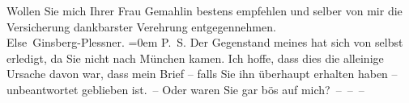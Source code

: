 \pstart
           Wollen Sie mich Ihrer Frau Gemahlin bestens empfehlen und selber von mir die Versicherung dankbarster
               Verehrung entgegennehmen.{\\[\baselineskip]}\spacefill\mbox{Else Ginsberg-Plessner.}\pend
           \leftskip=0em{}
\pstart
           \noindent{}P. S. Der Gegenstand meines \label{K_L03730-6v}\label{K_L03730-6} hat sich von selbst
                  erledigt, da Sie nicht nach München kamen.
                  Ich hoffe, dass dies die alleinige Ursache davon war, dass mein Brief – falls Sie
                  ihn überhaupt erhalten haben – unbeantwortet geblieben ist. – Oder waren Sie gar
                  bös auf mich? – – –\pend
           \endnumbering{}  \newcommand{\dateiname}{L03730}\newcommand{\titel}{Elsa Ginsberg-Plessner an Arthur Schnitzler, 9. 1. 1916}\newcommand{\editorInnen}{Selma Jahnke und Martin Anton Müller}

